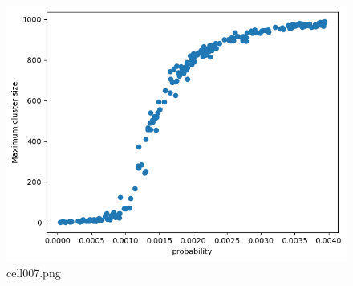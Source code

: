 \begin{figure}[ht]
	\centering
	\includegraphics[scale=0.8, max width=\linewidth]{./fig/appendix/graph-theory-network-model/cell007.png}
	\caption{cell007.png}
	\label{cell007.png}
\end{figure}